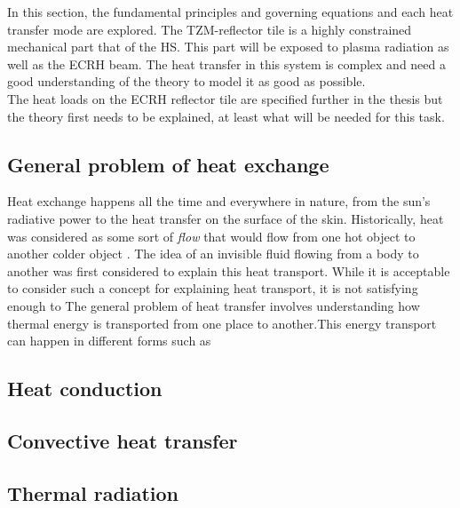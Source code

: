 \normalsize{In this section, the fundamental principles and governing equations and each heat transfer mode are explored. The TZM-reflector tile is a highly constrained mechanical part that of the \acrshort{HS}. This part will be exposed to plasma radiation as well as the \acrshort{ECRH} beam. The heat transfer in this system is complex and need a good understanding of the theory to model it as good as possible.}
\\
\normalsize{\indent The heat loads on the \acrshort{ECRH} reflector tile are specified further in the thesis but the theory first needs to be explained, at least what will be needed for this task.}
\\
\subsection{General problem of heat exchange}
\normalsize{Heat exchange happens all the time and everywhere in nature, from the sun's radiative power to the heat transfer on the surface of the skin. Historically, heat was considered as some sort of} {\it flow} 
\normalsize{ that would flow from one hot object to another colder object \cites{ahtt6e}. The idea of an invisible fluid flowing from a body to another was first considered to explain this heat transport. While it is acceptable to consider such a concept for explaining heat transport, it is not satisfying enough to 
The general problem of heat transfer involves understanding how thermal energy is transported from one place to another.This energy transport can happen in different forms such as  }

\subsection{Heat conduction}
\subsection{Convective heat transfer}
\subsection{Thermal radiation}